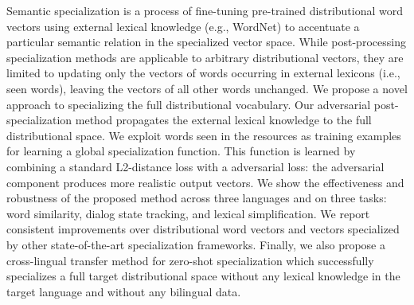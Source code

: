 Semantic specialization is a process of fine-tuning pre-trained distributional word vectors using external lexical knowledge (e.g., WordNet) to accentuate a particular semantic relation in the specialized vector space. While post-processing specialization methods are applicable to arbitrary distributional vectors, they are limited to updating only the vectors of words occurring in external lexicons (i.e., seen words), leaving the vectors of all other words unchanged. We propose a novel approach to specializing the full distributional vocabulary. Our adversarial post-specialization method propagates the external lexical knowledge to the full distributional space. We exploit words seen in the resources as training examples for learning a global specialization function. This function is learned by combining a standard L2-distance loss with a adversarial loss: the adversarial component produces more realistic output vectors. We show the effectiveness and robustness of the proposed method across three languages and on three tasks: word similarity, dialog state tracking, and lexical simplification. We report consistent improvements over distributional word vectors and vectors specialized by other state-of-the-art specialization frameworks. Finally, we also propose a cross-lingual transfer method for zero-shot specialization which successfully specializes a full target distributional space without any lexical knowledge in the target language and without any bilingual data.
